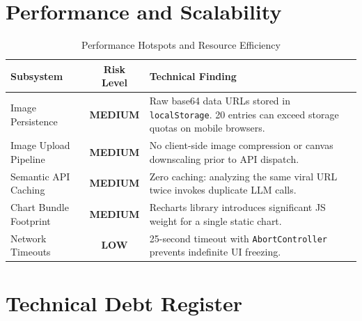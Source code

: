 \documentclass[10pt,a4paper]{report}
\newcommand{\badgeMed}{\colorbox{yellow!30}{\textcolor{warnOrange!80!black}{\bfseries\scriptsize MEDIUM}}}
\newcommand{\badgeLow}{\colorbox{green!15}{\textcolor{passGreen}{\bfseries\scriptsize LOW}}}
\begin{document}
\chapter{Performance and Scalability}

\begin{table}[htbp]
\centering
\small
\caption{Performance Hotspots and Resource Efficiency}
\begin{tabularx}{\textwidth}{l c X}
\toprule
\textbf{Subsystem} & \textbf{Risk Level} & \textbf{Technical Finding} \\
\midrule
Image Persistence & \badgeMed & Raw base64 data URLs stored in \texttt{localStorage}. 20 entries can exceed storage quotas on mobile browsers. \\
\addlinespace
Image Upload Pipeline & \badgeMed & No client-side image compression or canvas downscaling prior to API dispatch. \\
\addlinespace
Semantic API Caching & \badgeMed & Zero caching: analyzing the same viral URL twice invokes duplicate LLM calls. \\
\addlinespace
Chart Bundle Footprint & \badgeMed & Recharts library introduces significant JS weight for a single static chart. \\
\addlinespace
Network Timeouts & \badgeLow & 25-second timeout with \texttt{AbortController} prevents indefinite UI freezing. \\
\bottomrule
\end{tabularx}
\end{table}

\chapter{Technical Debt Register}
\end{document}
